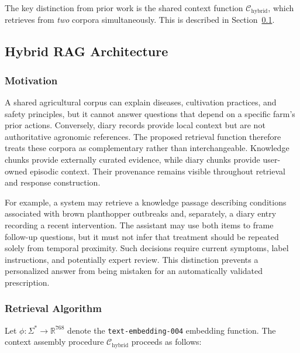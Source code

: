 \documentclass[conference]{IEEEtran}
\begin{document}
The key distinction from prior work is the shared context function
$\mathcal{C}_{\mathrm{hybrid}}$, which retrieves from \emph{two}
corpora simultaneously. This is described in
Section~\ref{sec:hybrid_rag}.

\subsection{Hybrid RAG Architecture}
\label{sec:hybrid_rag}

\subsubsection{Motivation}

A shared agricultural corpus can explain diseases, cultivation practices, and safety principles, but it cannot answer questions that depend on a specific farm's prior actions. Conversely, diary records provide local context but are not authoritative agronomic references. The proposed retrieval function therefore treats these corpora as complementary rather than interchangeable. Knowledge chunks provide externally curated evidence, while diary chunks provide user-owned episodic context. Their provenance remains visible throughout retrieval and response construction.

For example, a system may retrieve a knowledge passage describing conditions associated with brown planthopper outbreaks and, separately, a diary entry recording a recent intervention. The assistant may use both items to frame follow-up questions, but it must not infer that treatment should be repeated solely from temporal proximity. Such decisions require current symptoms, label instructions, and potentially expert review. This distinction prevents a personalized answer from being mistaken for an automatically validated prescription.

\subsubsection{Retrieval Algorithm}

Let $\phi: \Sigma^* \to \mathbb{R}^{768}$ denote the
\texttt{text-embedding-004} embedding function. The context assembly
procedure $\mathcal{C}_{\mathrm{hybrid}}$ proceeds as follows:
\end{document}
